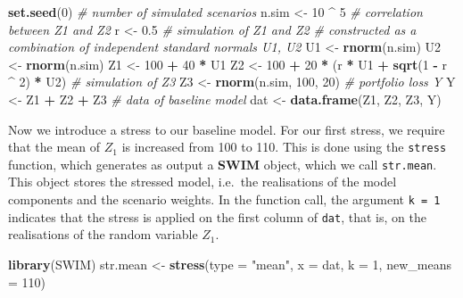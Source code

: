 \documentclass[
]{article}
\newenvironment{Shaded}{\begin{snugshade}}{\end{snugshade}}
\newcommand{\CommentTok}[1]{\textcolor[rgb]{0.56,0.35,0.01}{\textit{#1}}}
\newcommand{\DataTypeTok}[1]{\textcolor[rgb]{0.13,0.29,0.53}{#1}}
\newcommand{\DecValTok}[1]{\textcolor[rgb]{0.00,0.00,0.81}{#1}}
\newcommand{\FloatTok}[1]{\textcolor[rgb]{0.00,0.00,0.81}{#1}}
\newcommand{\KeywordTok}[1]{\textcolor[rgb]{0.13,0.29,0.53}{\textbf{#1}}}
\newcommand{\NormalTok}[1]{#1}
\newcommand{\OperatorTok}[1]{\textcolor[rgb]{0.81,0.36,0.00}{\textbf{#1}}}
\newcommand{\StringTok}[1]{\textcolor[rgb]{0.31,0.60,0.02}{#1}}
\begin{document}
\begin{Shaded}
\begin{Highlighting}[]
\KeywordTok{set.seed}\NormalTok{(}\DecValTok{0}\NormalTok{)}
\CommentTok{# number of simulated scenarios}
\NormalTok{n.sim <-}\StringTok{ }\DecValTok{10} \OperatorTok{^}\StringTok{ }\DecValTok{5}
\CommentTok{# correlation between Z1 and Z2}
\NormalTok{r <-}\StringTok{ }\FloatTok{0.5}
\CommentTok{# simulation of Z1  and Z2}
\CommentTok{# constructed as a combination of independent standard normals U1, U2}
\NormalTok{U1 <-}\StringTok{ }\KeywordTok{rnorm}\NormalTok{(n.sim)}
\NormalTok{U2 <-}\StringTok{ }\KeywordTok{rnorm}\NormalTok{(n.sim)}
\NormalTok{Z1 <-}\StringTok{ }\DecValTok{100} \OperatorTok{+}\StringTok{ }\DecValTok{40} \OperatorTok{*}\StringTok{ }\NormalTok{U1}
\NormalTok{Z2 <-}\StringTok{ }\DecValTok{100} \OperatorTok{+}\StringTok{ }\DecValTok{20} \OperatorTok{*}\StringTok{ }\NormalTok{(r }\OperatorTok{*}\StringTok{ }\NormalTok{U1 }\OperatorTok{+}\StringTok{ }\KeywordTok{sqrt}\NormalTok{(}\DecValTok{1} \OperatorTok{-}\StringTok{ }\NormalTok{r }\OperatorTok{^}\StringTok{ }\DecValTok{2}\NormalTok{) }\OperatorTok{*}\StringTok{ }\NormalTok{U2)}
\CommentTok{# simulation of Z3}
\NormalTok{Z3 <-}\StringTok{ }\KeywordTok{rnorm}\NormalTok{(n.sim, }\DecValTok{100}\NormalTok{, }\DecValTok{20}\NormalTok{)}
\CommentTok{# portfolio loss Y}
\NormalTok{Y <-}\StringTok{ }\NormalTok{Z1 }\OperatorTok{+}\StringTok{ }\NormalTok{Z2 }\OperatorTok{+}\StringTok{ }\NormalTok{Z3}
\CommentTok{# data of baseline model}
\NormalTok{dat <-}\StringTok{ }\KeywordTok{data.frame}\NormalTok{(Z1, Z2, Z3, Y)}
\end{Highlighting}
\end{Shaded}

Now we introduce a stress to our baseline model. For our first stress, we require that the mean of \(Z_1\) is increased from 100 to 110. This is done using the \texttt{stress} function, which generates as output a \textbf{SWIM} object, which we call \texttt{str.mean}. This object stores the stressed model, i.e.~the realisations of the model components and the scenario weights. In the function call, the argument \texttt{k\ =\ 1} indicates that the stress is applied on the first column of \texttt{dat}, that is, on the realisations of the random variable \(Z_1\).

\begin{Shaded}
\begin{Highlighting}[]
\KeywordTok{library}\NormalTok{(SWIM)}
\NormalTok{str.mean <-}\StringTok{ }\KeywordTok{stress}\NormalTok{(}\DataTypeTok{type =} \StringTok{"mean"}\NormalTok{, }\DataTypeTok{x =}\NormalTok{ dat, }\DataTypeTok{k =} \DecValTok{1}\NormalTok{, }\DataTypeTok{new_means =} \DecValTok{110}\NormalTok{)}
\end{Highlighting}
\end{Shaded}
\end{document}
